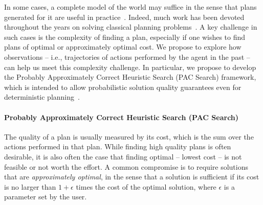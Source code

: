 \documentclass[12pt]{article}
\begin{document}
In some cases, a complete model of the world may suffice in the sense that plans generated for it are useful in practice~\cite{ruml2011line,robinson2014cost,hoffmann2015simulated,hoffmann2007web}. Indeed, much work has been devoted throughout the years on solving classical planning problems~\cite{ghallab2004automated}. A key challenge in such cases is the complexity of finding a plan, especially if one wishes to find plans of optimal or approximately optimal cost. 
We propose to explore how observations -- i.e., trajectories of actions performed by the agent in the past -- can help us meet this complexity challenge. %
In particular, we propose to develop the Probably Approximately Correct Heuristic Search (PAC Search) framework, which is intended to allow probabilistic solution quality guarantees even for deterministic planning~\cite{stern2011probably,stern2012search}. %

\paragraph{Probably Approximately Correct Heuristic Search (PAC Search)} 
The quality of a plan is usually measured by its cost, which is the sum over the actions performed in that plan. While finding high quality plans is often desirable, it is also often the case that finding optimal -- lowest cost -- is  not feasible or not worth the effort. A common compromise is to require solutions that are {\em approximately optimal}, in the sense that a solution is sufficient if its cost is no larger than $1+\epsilon$ times the cost of the optimal solution, where $\epsilon$ is a parameter set by the user. 
\end{document}
